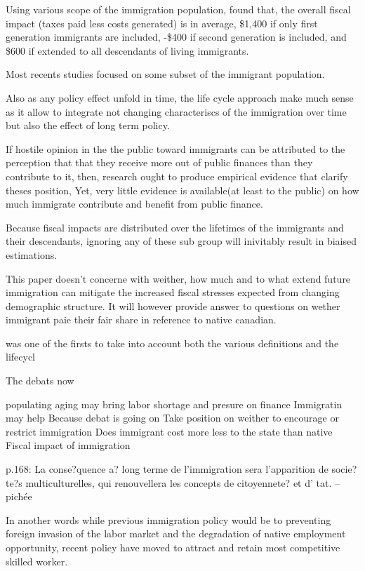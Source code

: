   Using various scope of the immigration population, \citep{Lee:1998fs}  found that, the overall fiscal impact (taxes paid less costs generated) is in average, \$1,400 if only first generation immigrants are included, -\$400 if second generation is included, and  \$600 if extended to all descendants of living immigrants.

  Most recents studies focused on some subset of the immigrant population.

  Also as any policy effect unfold in time, the life cycle approach make much sense as it allow to integrate not changing characteriscs of the immigration over time but also the effect of long term policy.





  If hostile opinion in the the public toward immigrants can be attributed to the perception that  that they receive more out of public finances than they contribute to it, then, research ought to produce empirical evidence that clarify theses position, Yet, very little evidence is available(at least to the public) on how much immigrate contribute and benefit from public finance.

  Because fiscal impacts are distributed over the lifetimes of the immigrants and their descendants, ignoring any of these sub group will inivitably result in biaised estimations.


  This paper doesn't concerne with weither, how much and to what extend future immigration can mitigate the increased fiscal stresses expected from changing demographic structure. It will however provide answer to questions on wether immigrant paie their fair share in reference to native canadian.




  \citep{Lee:1998fs} was one of the firsts  to take into account both the various definitions and the lifecycl


  The debats now

populating aging may bring labor  shortage and presure on finance
Immigratin may help
Because debat is going on
Take position on weither to encourage or restrict immigration
Does immigrant cost more less to the state than native
Fiscal impact of immigration


p.168: La conse?quence a? long terme de l’immigration sera l’apparition de socie?te?s multiculturelles, qui renouvellera les concepts de citoyennete? et d’ tat. -- pichée


In another words while previous immigration policy would be to preventing foreign invasion of the labor  market and the degradation of native employment opportunity, recent policy have moved to attract and retain most competitive skilled worker.



